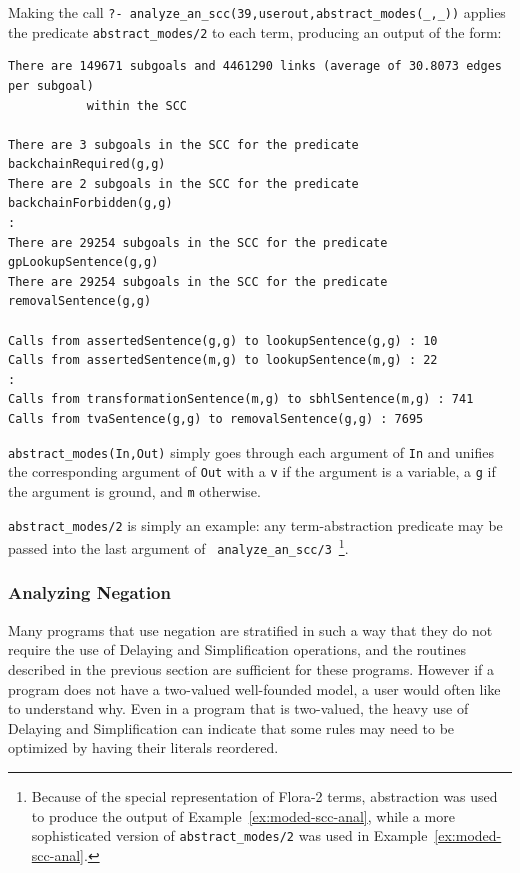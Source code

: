 \begin{example} \label{ex:moded-scc-anal} \rm
%
Making the call {\tt ?-
  analyze\_an\_scc(39,userout,abstract\_modes(\_,\_))} applies the
predicate {\tt abstract\_modes/2} to each term, producing an output of
the form:
%
\begin{verbatim}
There are 149671 subgoals and 4461290 links (average of 30.8073 edges per subgoal) 
           within the SCC

There are 3 subgoals in the SCC for the predicate backchainRequired(g,g)
There are 2 subgoals in the SCC for the predicate backchainForbidden(g,g)
:
There are 29254 subgoals in the SCC for the predicate gpLookupSentence(g,g)
There are 29254 subgoals in the SCC for the predicate removalSentence(g,g)

Calls from assertedSentence(g,g) to lookupSentence(g,g) : 10
Calls from assertedSentence(m,g) to lookupSentence(m,g) : 22
:
Calls from transformationSentence(m,g) to sbhlSentence(m,g) : 741
Calls from tvaSentence(g,g) to removalSentence(g,g) : 7695
\end{verbatim}
%
{\tt abstract\_modes(In,Out)} simply goes through each argument of
{\tt In} and unifies the corresponding argument of {\tt Out} with a
{\tt v} if the argument is a variable, a {\tt g} if the argument is
ground, and {\tt m} otherwise.  

\end{example}
%
{\tt abstract\_modes/2} is simply an example: any term-abstraction
predicate may be passed into the last argument of {\tt
  analyze\_an\_scc/3}~\footnote{Because of the special representation
  of Flora-2 terms, abstraction was used to produce the output of
  Example~\ref{ex:moded-scc-anal}, while a more sophisticated version
  of {\tt abstract\_modes/2} was used in
  Example~\ref{ex:moded-scc-anal}.}.

\subsubsection{Analyzing Negation}
%
Many programs that use negation are stratified in such a way that they
do not require the use of {\sc Delaying} and {\sc Simplification}
operations, and the routines described in the previous section are
sufficient for these programs.  However if a program does not have a
two-valued well-founded model, a user would often like to understand
why.  Even in a program that is two-valued, the heavy use of {\sc
  Delaying} and {\sc Simplification} can indicate that some rules may
need to be optimized by having their literals reordered.

